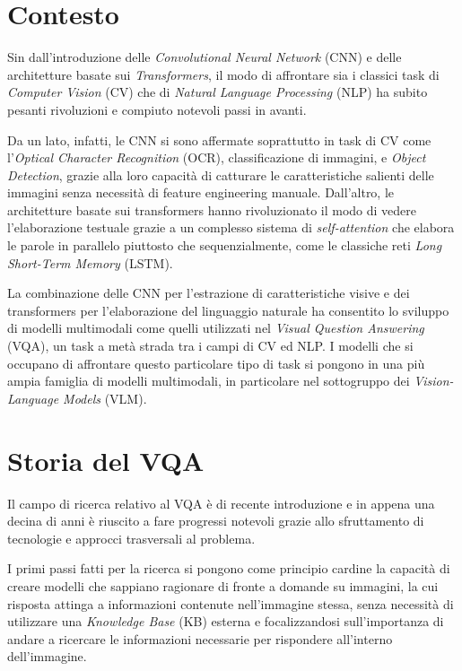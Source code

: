\documentclass[../main.tex]{subfiles}
\begin{document}
\section{Contesto}

Sin dall'introduzione delle \textit{Convolutional Neural Network} (CNN) e delle architetture basate sui \textit{Transformers}, il modo di affrontare sia i classici task di \textit{Computer Vision} (CV) che di \textit{Natural Language Processing} (NLP) ha subito pesanti rivoluzioni e compiuto notevoli passi in avanti.

Da un lato, infatti, le CNN si sono affermate soprattutto in task di CV come l'\textit{Optical Character Recognition} (OCR), classificazione di immagini, e \textit{Object Detection}, grazie alla loro capacità di catturare le caratteristiche salienti delle immagini senza necessità di feature engineering manuale. 
Dall'altro, le architetture basate sui transformers hanno rivoluzionato il modo di vedere l'elaborazione testuale grazie a un complesso sistema di \textit{self-attention} che elabora le parole in parallelo piuttosto che sequenzialmente, come le classiche reti \textit{Long Short-Term Memory} (LSTM).

La combinazione delle CNN per l'estrazione di caratteristiche visive e dei transformers per l'elaborazione del linguaggio naturale ha consentito lo sviluppo di modelli multimodali come quelli utilizzati nel \textit{Visual Question Answering} (VQA), un task a metà strada tra i campi di CV ed NLP. 
I modelli che si occupano di affrontare questo particolare tipo di task si pongono in una più ampia famiglia di modelli multimodali, in particolare nel sottogruppo dei \textit{Vision-Language Models} (VLM).

\section{Storia del VQA}

Il campo di ricerca relativo al VQA è di recente introduzione e in appena una decina di anni è riuscito a fare progressi notevoli grazie allo sfruttamento di tecnologie e approcci trasversali al problema.

I primi passi fatti per la ricerca si pongono come principio cardine la capacità di creare modelli che sappiano ragionare di fronte a domande su immagini, la cui risposta attinga a informazioni contenute nell'immagine stessa, senza necessità di utilizzare una \textit{Knowledge Base} (KB) esterna e focalizzandosi sull'importanza di andare a ricercare le informazioni necessarie per rispondere all'interno dell'immagine. 
\end{document}
